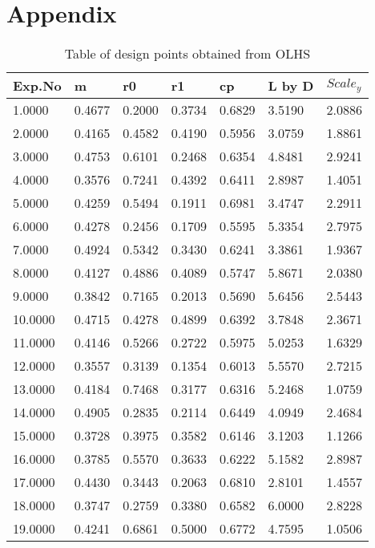 \appendix
\chapter*{Appendix}


\begin{longtable}{ p{}  p{}  p{}  p{}  p{} p{}  p{} }
	
\caption{Table of design points obtained from OLHS}
\label{Table of design points obtained from OLHS}
\\
\hline
Exp.No	&	m	&	r0	&	r1	&	cp	&	L by D	&	$ Scale_y $	\\
\hline 
1.0000	&	0.4677	&	0.2000	&	0.3734	&	0.6829	&	3.5190	&	2.0886	\\
2.0000	&	0.4165	&	0.4582	&	0.4190	&	0.5956	&	3.0759	&	1.8861	\\
3.0000	&	0.4753	&	0.6101	&	0.2468	&	0.6354	&	4.8481	&	2.9241	\\
4.0000	&	0.3576	&	0.7241	&	0.4392	&	0.6411	&	2.8987	&	1.4051	\\
5.0000	&	0.4259	&	0.5494	&	0.1911	&	0.6981	&	3.4747	&	2.2911	\\
6.0000	&	0.4278	&	0.2456	&	0.1709	&	0.5595	&	5.3354	&	2.7975	\\
7.0000	&	0.4924	&	0.5342	&	0.3430	&	0.6241	&	3.3861	&	1.9367	\\
8.0000	&	0.4127	&	0.4886	&	0.4089	&	0.5747	&	5.8671	&	2.0380	\\
9.0000	&	0.3842	&	0.7165	&	0.2013	&	0.5690	&	5.6456	&	2.5443	\\
10.0000	&	0.4715	&	0.4278	&	0.4899	&	0.6392	&	3.7848	&	2.3671	\\
11.0000	&	0.4146	&	0.5266	&	0.2722	&	0.5975	&	5.0253	&	1.6329	\\
12.0000	&	0.3557	&	0.3139	&	0.1354	&	0.6013	&	5.5570	&	2.7215	\\
13.0000	&	0.4184	&	0.7468	&	0.3177	&	0.6316	&	5.2468	&	1.0759	\\
14.0000	&	0.4905	&	0.2835	&	0.2114	&	0.6449	&	4.0949	&	2.4684	\\
15.0000	&	0.3728	&	0.3975	&	0.3582	&	0.6146	&	3.1203	&	1.1266	\\
16.0000	&	0.3785	&	0.5570	&	0.3633	&	0.6222	&	5.1582	&	2.8987	\\
17.0000	&	0.4430	&	0.3443	&	0.2063	&	0.6810	&	2.8101	&	1.4557	\\
18.0000	&	0.3747	&	0.2759	&	0.3380	&	0.6582	&	6.0000	&	2.8228	\\
19.0000	&	0.4241	&	0.6861	&	0.5000	&	0.6772	&	4.7595	&	1.0506	\\

\end{longtable}
